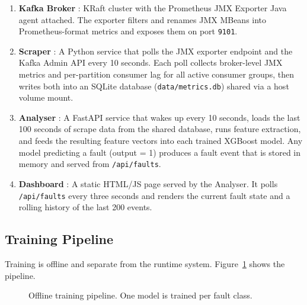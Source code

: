 \documentclass[12pt, a4paper]{article}
\begin{document}
\begin{enumerate}[leftmargin=*, label=\textbf{\arabic*.}]
    \item \textbf{Kafka Broker} : KRaft cluster with the Prometheus
          JMX Exporter Java agent attached. The exporter filters and renames
          JMX MBeans into Prometheus-format metrics and exposes them on port
          \texttt{9101}.
    \item \textbf{Scraper} : A Python service that polls the JMX exporter
          endpoint and the Kafka Admin API every 10 seconds. Each poll collects
          broker-level JMX metrics and per-partition consumer lag for all active
          consumer groups, then writes both into an SQLite database
          (\texttt{data/metrics.db}) shared via a host volume mount.
    \item \textbf{Analyser} : A FastAPI service that wakes up every 10 seconds,
          loads the last 100 seconds of scrape data from the shared database,
          runs feature extraction, and feeds the resulting feature vectors into
          each trained XGBoost model. Any model predicting a fault (output = 1)
          produces a fault event that is stored in memory and served from
          \texttt{/api/faults}.
    \item \textbf{Dashboard} : A static HTML/JS page served by the Analyser.
          It polls \texttt{/api/faults} every three seconds and renders the
          current fault state and a rolling history of the last 200 events.
\end{enumerate}

\subsection{Training Pipeline}

Training is offline and separate from the runtime system.
Figure~\ref{fig:train-pipeline} shows the pipeline.

\begin{figure}[H]
\centering
{}
\caption{Offline training pipeline. One model is trained per fault class.}
\label{fig:train-pipeline}
\end{figure}
\end{document}
